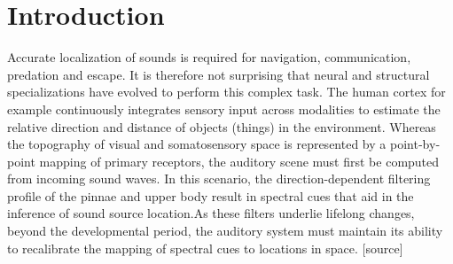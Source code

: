 \newpage\section{Introduction}\label{sec1}%
Accurate localization of sounds is required for navigation, communication, predation and escape. It is therefore not surprising that neural and structural specializations have evolved to perform this complex task. The human cortex for example continuously integrates sensory input across modalities to estimate the relative direction and distance of objects (things) in the environment. Whereas the topography of visual and somatosensory space is represented by a point‐by‐point mapping of primary receptors, the auditory scene must first be computed from incoming sound waves. In this scenario, the direction-dependent filtering profile of the pinnae and upper body result in spectral cues that aid in the inference of sound source location.As these filters underlie lifelong changes, beyond the developmental period, the auditory system must maintain its ability to recalibrate the mapping of spectral cues to locations in space. [source] 

\newpage
